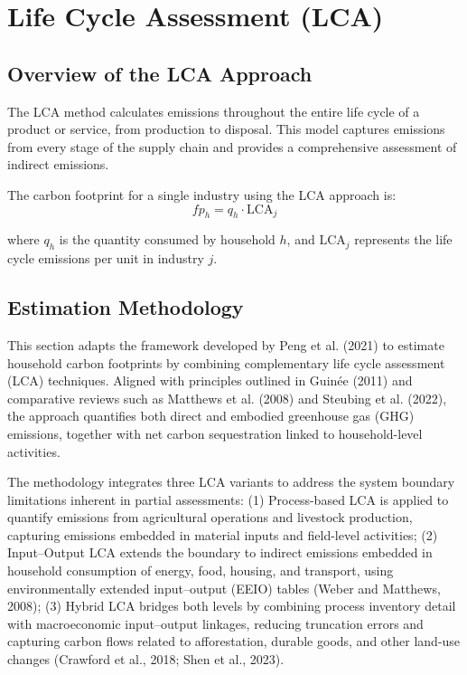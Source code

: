\documentclass[12pt,a4paper]{article}%
\begin{document}
\section{Life Cycle Assessment (LCA)}
\subsection{Overview of the LCA Approach}
The LCA method calculates emissions throughout the entire life cycle of a product or service, from production to disposal. This model captures emissions from every stage of the supply chain and provides a comprehensive assessment of indirect emissions.

The carbon footprint for a single industry using the LCA approach is:
\begin{equation}
   fp_h = q_h \cdot \text{LCA}_j 
\end{equation}

where \(q_h\) is the quantity consumed by household \(h\), and \(\text{LCA}_j\) represents the life cycle emissions per unit in industry \(j\).


\subsection{Estimation Methodology}
This section adapts the framework developed by Peng et al. (2021) to estimate household carbon footprints by combining complementary life cycle assessment (LCA) techniques. Aligned with principles outlined in Guinée (2011) and comparative reviews such as Matthews et al. (2008) and Steubing et al. (2022), the approach quantifies both direct and embodied greenhouse gas (GHG) emissions, together with net carbon sequestration linked to household-level activities.

The methodology integrates three LCA variants to address the system boundary limitations inherent in partial assessments: (1) Process-based LCA is applied to quantify emissions from agricultural operations and livestock production, capturing emissions embedded in material inputs and field-level activities; (2) Input–Output LCA extends the boundary to indirect emissions embedded in household consumption of energy, food, housing, and transport, using environmentally extended input–output (EEIO) tables (Weber and Matthews, 2008); (3) Hybrid LCA bridges both levels by combining process inventory detail with macroeconomic input–output linkages, reducing truncation errors and capturing carbon flows related to afforestation, durable goods, and other land-use changes (Crawford et al., 2018; Shen et al., 2023).
\end{document}
